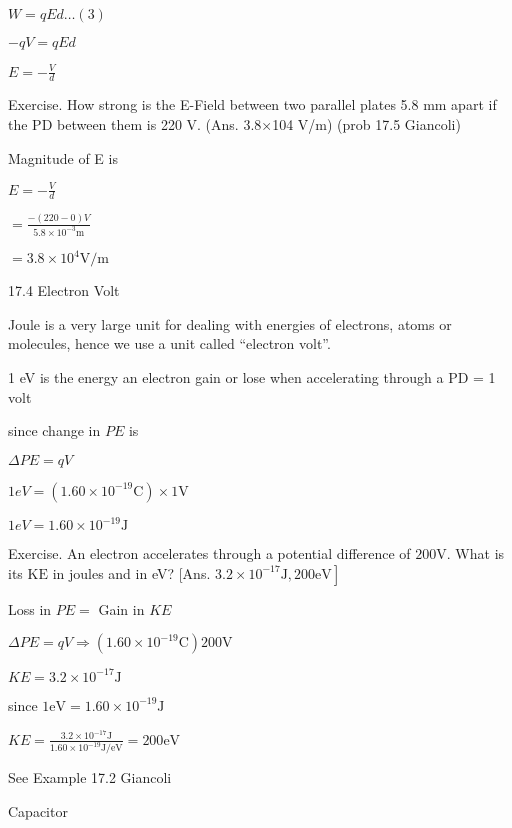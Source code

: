 \documentclass{extarticle}
\begin{document}
$W=q E d \ldots(3)$

$-q V=q E d$

$E=-\frac{V}{d}$






Exercise. How strong is the E-Field between two parallel
plates 5.8 mm apart if the PD between them is 220 V.
(Ans. 3.8×104 V/m) (prob 17.5 Giancoli)

Magnitude of E is

$E=-\frac{V}{d}$

$=\frac{-(220-0) V}{5.8 \times 10^{-3} \mathrm{m}}$

$=3.8 \times 10^{4} \mathrm{V} / \mathrm{m}$







17.4 Electron Volt

Joule is a very large unit for dealing with energies of
electrons, atoms or molecules, hence we use a unit
called “electron volt”.

1 eV is the energy an electron gain or lose when
accelerating through a PD = 1 volt

since change in $P E$ is

$\Delta P E=q V$

$1 e V=\left(1.60 \times 10^{-19} \mathrm{C}\right) \times 1 \mathrm{V}$

$1 e V=1.60 \times 10^{-19} \mathrm{J}$






Exercise. An electron accelerates through a potential difference of $200 \mathrm{V}$. What is its $\mathrm{KE}$ in joules and in eV? [Ans. $\left.3.2 \times 10^{-17} \mathrm{J}, 200 \mathrm{eV}\right]$


Loss in $P E=$ Gain in $K E$

$\Delta P E=q V \Rightarrow\left(1.60 \times 10^{-19} \mathrm{C}\right) 200 \mathrm{V}$

$K E=3.2 \times 10^{-17} \mathrm{J}$

since $1 \mathrm{eV}=1.60 \times 10^{-19} \mathrm{J}$

$K E=\frac{3.2 \times 10^{-17} \mathrm{J}}{1.60 \times 10^{-19} \mathrm{J} / \mathrm{eV}}=200 \mathrm{eV}$

See Example 17.2 Giancoli







Capacitor
\end{document}
